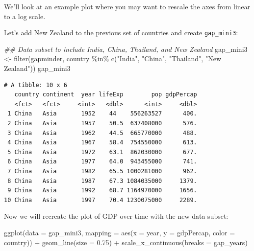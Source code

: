 \documentclass[
  letterpaper,
  DIV=11,
  numbers=noendperiod]{scrreprt}
\newenvironment{Shaded}{\begin{snugshade}}{\end{snugshade}}
\newcommand{\AttributeTok}[1]{\textcolor[rgb]{0.40,0.45,0.13}{#1}}
\newcommand{\DocumentationTok}[1]{\textcolor[rgb]{0.37,0.37,0.37}{\textit{#1}}}
\newcommand{\FloatTok}[1]{\textcolor[rgb]{0.68,0.00,0.00}{#1}}
\newcommand{\FunctionTok}[1]{\textcolor[rgb]{0.28,0.35,0.67}{#1}}
\newcommand{\NormalTok}[1]{\textcolor[rgb]{0.00,0.23,0.31}{#1}}
\newcommand{\OtherTok}[1]{\textcolor[rgb]{0.00,0.23,0.31}{#1}}
\newcommand{\SpecialCharTok}[1]{\textcolor[rgb]{0.37,0.37,0.37}{#1}}
\newcommand{\StringTok}[1]{\textcolor[rgb]{0.13,0.47,0.30}{#1}}
\begin{document}
We'll look at an example plot where you may want to rescale the axes
from linear to a log scale.

Let's add New Zealand to the previous set of countries and create
\texttt{gap\_mini3}:

\begin{Shaded}
\begin{Highlighting}[]
\DocumentationTok{\#\# Data subset to include India, China, Thailand, and New Zealand}
\NormalTok{gap\_mini3 }\OtherTok{\textless{}{-}} \FunctionTok{filter}\NormalTok{(gapminder,}
\NormalTok{                    country }\SpecialCharTok{\%in\%} \FunctionTok{c}\NormalTok{(}\StringTok{"India"}\NormalTok{,}
                                   \StringTok{"China"}\NormalTok{,}
                                   \StringTok{"Thailand"}\NormalTok{,}
                                   \StringTok{"New Zealand"}\NormalTok{))}
\NormalTok{gap\_mini3}
\end{Highlighting}
\end{Shaded}

\begin{verbatim}
# A tibble: 10 x 6
   country continent  year lifeExp        pop gdpPercap
   <fct>   <fct>     <int>   <dbl>      <int>     <dbl>
 1 China   Asia       1952    44    556263527      400.
 2 China   Asia       1957    50.5  637408000      576.
 3 China   Asia       1962    44.5  665770000      488.
 4 China   Asia       1967    58.4  754550000      613.
 5 China   Asia       1972    63.1  862030000      677.
 6 China   Asia       1977    64.0  943455000      741.
 7 China   Asia       1982    65.5 1000281000      962.
 8 China   Asia       1987    67.3 1084035000     1379.
 9 China   Asia       1992    68.7 1164970000     1656.
10 China   Asia       1997    70.4 1230075000     2289.
\end{verbatim}

Now we will recreate the plot of GDP over time with the new data subset:

\begin{Shaded}
\begin{Highlighting}[]
\FunctionTok{ggplot}\NormalTok{(}\AttributeTok{data =}\NormalTok{ gap\_mini3, }
       \AttributeTok{mapping =} \FunctionTok{aes}\NormalTok{(}\AttributeTok{x =}\NormalTok{ year, }
                     \AttributeTok{y =}\NormalTok{ gdpPercap, }
                     \AttributeTok{color =}\NormalTok{ country)) }\SpecialCharTok{+}
  \FunctionTok{geom\_line}\NormalTok{(}\AttributeTok{size =} \FloatTok{0.75}\NormalTok{) }\SpecialCharTok{+}
  \FunctionTok{scale\_x\_continuous}\NormalTok{(}\AttributeTok{breaks =}\NormalTok{ gap\_years)}
\end{Highlighting}
\end{Shaded}
\end{document}
